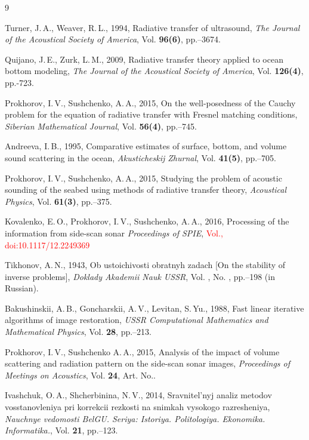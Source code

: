 \documentclass{procDDs}
\begin{document}
\begin {thebibliography}{9}

 Turner, J.\,A., Weaver, R.\,L., 1994, 
			Radiative transfer of ultrasound, 
			\emph{The Journal of the Acoustical Society of America},  
			Vol.\; {\bf 96(6)}, pp.--3674.

 Quijano, J.\,E., Zurk, L.\,M., 2009, 
			Radiative transfer theory applied to ocean bottom modeling, 
			\emph{The Journal of the Acoustical Society of America},  
			Vol.\; {\bf 126(4)}, pp.-723.

 Prokhorov, I.\,V., Sushchenko,  A.\,A., 2015, 
			On the well-posedness of the Cauchy problem for the equation of radiative transfer with Fresnel matching conditions,
			\emph{Siberian Mathematical Journal},
			Vol.\; {\bf 56(4)}, pp.--745. 


 Andreeva,  I.\,B., 1995,
			Comparative estimates of surface, bottom, and volume sound scattering in the ocean,
			\emph{Akusticheskij Zhurnal},
			Vol.\; {\bf 41(5)}, pp.--705.


  Prokhorov, I.\,V., Sushchenko, A.\,A., 2015, 
			Studying the problem of acoustic sounding of the seabed using methods of radiative transfer theory, 
			\emph{Acoustical Physics},
			Vol.\; {\bf 61(3)}, pp.--375.

 Kovalenko, E.\,O., Prokhorov, I.\,V., Sushchenko, A.\,A., 2016,
			Processing of the information from side-scan sonar
			\emph{Proceedings of SPIE},
			\textcolor{red}{ Vol., doi:10.1117/12.2249369 }

 Tikhonov, A.\,N., 1943, 
			Ob ustoichivosti obratnyh zadach [On the stability of inverse problems], 
			\emph{Doklady Akademii Nauk USSR}, 
			Vol. , No. , pp.–198 (in Russian).

 Bakushinskii, A.\,B., Goncharskii, A.\,V., Levitan, S.\,Yu., 1988,
			Fast linear iterative algorithms of image restoration,
			\emph{USSR Computational Mathematics and Mathematical Physics},
			Vol.\; {\bf 28}, pp.\; 210--213.

 Prokhorov, I.\,V., Sushchenko A.\,A., 2015,
			 Analysis of the impact of volume scattering and radiation pattern on the side-scan sonar images, 
			 \emph{Proceedings of Meetings on Acoustics},
			 Vol.\; {\bf 24}, Art. No..

 Ivashchuk, O.\,A., Shcherbinina, N.\,V., 2014,
			Sravnitel'nyj analiz metodov vosstanovleniya pri korrekcii rezkosti na snimkah vysokogo razresheniya, 
			\emph{Nauchnye vedomosti BelGU. Seriya: Istoriya. Politologiya. Ekonomika. Informatika.},
			Vol.\; {\bf 21}, pp.\; 118--123.
			

\end{thebibliography}
\end{document}
